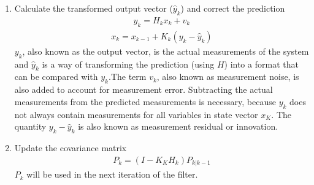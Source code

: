 \begin{enumerate}
    \item Calculate the transformed output vector ($\hat y_k$) and correct the prediction  
    \begin{align*}
        \hat y_k = H_k x_k + v_k
    \end{align*}
    \begin{align*} 
        x_k = x_{k - 1} + K_k(y_k - \hat y_{k})
    \end{align*}
        $y_k$, also known as the output vector, is the actual measurements of the system and $\hat y_k$ is a way of transforming the prediction (using $H$) into a format that can be compared with $y_k$.The term $v_k$, also known as measurement noise, is also added to account for measurement error. Subtracting the actual measurements from the predicted measurements is necessary, because $y_k$ does not always contain measurements for all variables in state vector $x_K$. The quantity $y_k - \hat y_{k}$ is also known as measurement residual or innovation.  \\
     \item Update the covariance matrix
    \begin{align*} 
        P_k = (I - K_K H_k) P_{k | k-1}
    \end{align*}
    $ P_k $ will be used in the next iteration of the filter.
\end{enumerate} 




